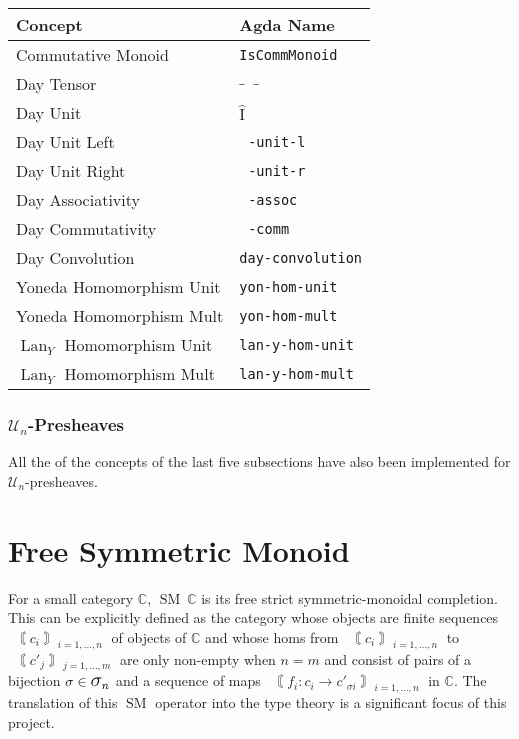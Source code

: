 \documentclass[12pt, parskip, DIV=14]{scrbook}
\newcommand{\SM}{\operatorname{SM}}
\DeclareMathOperator\daytensor{\widehat\otimes}
\newcommand{\dayid}{\operatorname{\hat{I}}}
\newcommand{\Lan}{\operatorname{Lan}}
\begin{document}
\begin{center}
\begin{tabular}{ll}
  Concept & Agda Name \\
  \hline
  Commutative Monoid & \texttt{IsCommMonoid} \\
  Day Tensor & $\_\daytensor\_$ \\
  Day Unit & $\dayid$ \\
  Day Unit Left & \texttt{$\daytensor$-unit-l} \\
  Day Unit Right & \texttt{$\daytensor$-unit-r} \\
  Day Associativity & \texttt{$\daytensor$-assoc} \\
  Day Commutativity & \texttt{$\daytensor$-comm} \\
  Day Convolution & \texttt{day-convolution} \\
  Yoneda Homomorphism Unit & \texttt{yon-hom-unit} \\
  Yoneda Homomorphism Mult & \texttt{yon-hom-mult} \\
  $\Lan_Y$ Homomorphism Unit & \texttt{lan-y-hom-unit} \\
  $\Lan_Y$ Homomorphism Mult & \texttt{lan-y-hom-mult} \\
\end{tabular}
\end{center}

\subsection{$\mathcal{U}_n$-Presheaves}

All the of the concepts of the last five subsections have also been implemented for $\mathcal{U}_n$-presheaves.

\chapter{Free Symmetric Monoid}

For a small category $\mathbb{C}$, $\SM~\mathbb{C}$ is its free strict symmetric-monoidal completion. This can be explicitly defined as the category whose objects are finite sequences $\Lbrbrak c_i \Rbrbrak_{i = 1,\dots,n}$ of objects of $\mathbb{C}$ and whose homs from $\Lbrbrak c_i \Rbrbrak_{i = 1,\dots,n}$ to $\Lbrbrak c'_j \Rbrbrak_{j = 1,\dots,m}$ are only non-empty when $n = m$ and consist of pairs of a bijection $\sigma \in \mathlarger{\mathlarger{\mathlarger{\sigma}}}_n$ and a sequence of maps $\Lbrbrak f_i : c_i \to c'_{\sigma i} \Rbrbrak_{i = 1,\dots,n}$ in $\mathbb{C}$. The translation of this $\SM$ operator into the type theory is a significant focus of this project.
\end{document}

